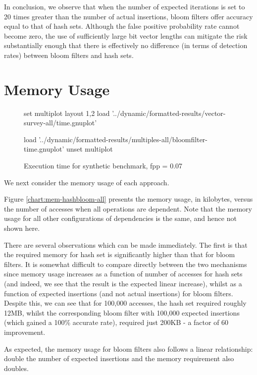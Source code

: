 In conclusion, we observe that when the number of expected iterations is set to 20 times greater than the number of actual insertions, bloom filters offer accuracy equal to that of hash sets. Although the false positive probability rate cannot become zero, the use of sufficiently large bit vector lengths can mitigate the risk substantially enough that there is effectively no difference (in terms of detection rates) between bloom filters and hash sets.

\section{Memory Usage} \label{sec:results/memory}
\begin{figure}
	\centering
	\begin{gnuplot}[terminal=pdf]
	set multiplot layout 1,2
		load '../dynamic/formatted-results/vector-survey-all/time.gnuplot'
		
		load '../dynamic/formatted-results/multiples-all/bloomfilter-time.gnuplot'
	unset multiplot
	\end{gnuplot}
	\caption{Execution time for synthetic benchmark, fpp = 0.07}
	\label{chart:time-all}
\end{figure}
We next consider the memory usage of each approach.

Figure \ref{chart:mem-hashbloom-all} presents the memory usage, in kilobytes, versus the number of accesses when all operations are dependent. Note that the memory usage for all other configurations of dependencies is the same, and hence not shown here.

There are several observations which can be made immediately. The first is that the required memory for hash set is significantly higher than that for bloom filters. It is somewhat difficult to compare directly between the two mechanisms since memory usage increases as a function of number of accesses for hash sets (and indeed, we see that the result is the expected linear increase), whilst as a function of expected insertions (and not actual insertions) for bloom filters. Despite this, we can see that for 100,000 accesses, the hash set required roughly 12MB, whilst the corresponding bloom filter with 100,000 expected insertions (which gained a 100\% accurate rate), required just 200KB - a factor of 60 improvement.

As expected, the memory usage for bloom filters also follows a linear relationship: double the number of expected insertions and the memory requirement also doubles.

